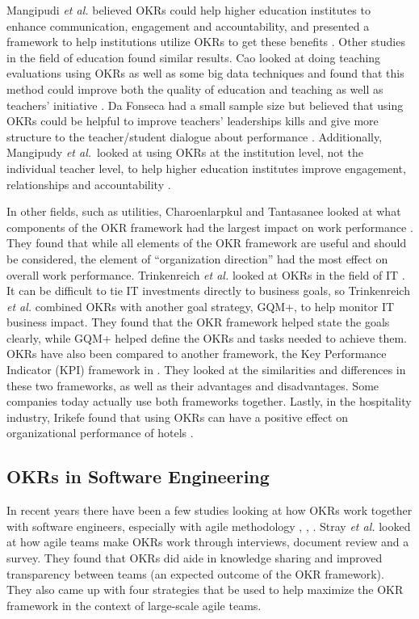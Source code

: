 \documentclass[sigconf, nonacm]{acmart}
\begin{document}
Mangipudi \textit{et al.} believed OKRs could help higher education institutes to enhance communication, engagement and accountability, and presented a framework to help institutions utilize OKRs to get these benefits \cite{rao}. Other studies in the field of education found similar results. Cao looked at doing teaching evaluations using OKRs as well as some big data techniques and found that this method could improve both the quality of education and teaching as well as teachers' initiative \cite{ruixia}. Da Fonseca had a small sample size but believed that using OKRs could be helpful to improve teachers' leaderships kills and give more structure to the teacher/student dialogue about performance \cite{fonseca}. Additionally, Mangipudy \textit{et al.}\ looked at using OKRs at the institution level, not the individual teacher level, to help higher education institutes improve engagement, relationships and accountability \cite{mangipudi}. 

In other fields, such as utilities, Charoenlarpkul and Tantasanee looked at what components of the OKR framework had the largest impact on work performance \cite{charo}. They found that while all elements of the OKR framework are useful and should be considered, the element of ``organization direction'' had the most effect on overall work performance. Trinkenreich \textit{et al.} looked at OKRs in the field of IT \cite{trink}. It can be difficult to tie IT investments directly to business goals, so Trinkenreich \textit{et al.} combined OKRs with another goal strategy, GQM+, to help monitor IT business impact. They found that the OKR framework helped state the goals clearly, while GQM+ helped define the OKRs and tasks needed to achieve them. OKRs have also been compared to another framework, the Key Performance Indicator (KPI) framework in \cite{businessSchool}. They looked at the similarities and differences in these two frameworks, as well as their advantages and disadvantages. Some companies today actually use both frameworks together. Lastly, in the hospitality industry, Irikefe found that using OKRs can have a positive effect on organizational performance of hotels \cite{pureheart}.


\subsection{OKRs in Software Engineering}
In recent years there have been a few studies looking at how OKRs work together with software engineers, especially with agile methodology \cite{ferrazzi}, \cite{stray1}, \cite{stray2}. Stray \textit{et al.} looked at how agile teams make OKRs work through interviews, document review and a survey. They found that OKRs did aide in knowledge sharing and improved transparency between teams (an expected outcome of the OKR framework). They also came up with four strategies that be used to help maximize the OKR framework in the context of large-scale agile teams. 
\end{document}

